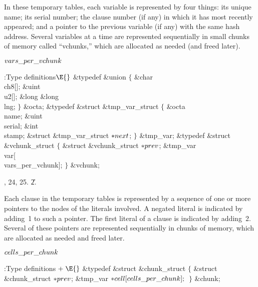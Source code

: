 In these temporary tables, each variable is represented by four things:
its unique name; its serial number; the clause number (if any) in which it has
most recently appeared; and a pointer to the previous variable (if any)
with the same hash address. Several variables at a time
are represented sequentially in small chunks of memory called ``vchunks,''
which are allocated as needed (and freed later).

\Y\B\4\D$\\{vars\_per\_vchunk}$ \5
\par
\Y\B\4:Type definitions\X${}\E{}$\6
\&{typedef} \&{union} ${}\{{}$\1\6
\&{char} \\{ch8}[];\6
\&{uint} \\{u2}[];\6
\&{long} \&{long} \\{lng};\2\6
${}\}{}$ \&{octa};\6
\&{typedef} \&{struct} \&{tmp\_var\_struct} ${}\{{}$\1\6
\&{octa} \\{name};\6
\&{uint} \\{serial};\6
\&{int} \\{stamp};\6
\&{struct} \&{tmp\_var\_struct} ${}{*}\\{next}{}$;\2%
\6
${}\}{}$ \&{tmp\_var};\7
\&{typedef} \&{struct} \&{vchunk\_struct} ${}\{{}$\1\6
\&{struct} \&{vchunk\_struct} ${}{*}\\{prev}{}$;\6
\&{tmp\_var} \\{var}[\\{vars\_per\_vchunk}];\2\6
${}\}{}$ \&{vchunk};\par
{}, 24, 25.
\U2.\fi

Each clause in the temporary tables is represented by a sequence of
one or more pointers to the  nodes of the literals involved.
A negated literal is indicated by adding~1 to such a pointer.
The first literal of a clause is indicated by adding~2.
Several of these pointers are represented sequentially in chunks
of memory, which are allocated as needed and freed later.

\Y\B\4\D$\\{cells\_per\_chunk}$ \5
\par
\Y\B\4:Type definitions\X${}\mathrel+\E{}$\6
\&{typedef} \&{struct} \&{chunk\_struct} ${}\{{}$\1\6
\&{struct} \&{chunk\_struct} ${}{*}\\{prev}{}$;\6
\&{tmp\_var} ${}{*}\\{cell}[\\{cells\_per\_chunk}];{}$\2\6
${}\}{}$ \&{chunk};\par
\fi

